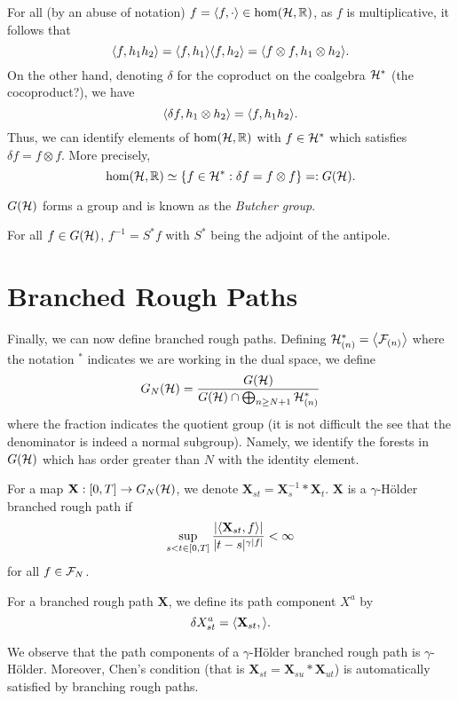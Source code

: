 \documentclass[a4paper, 10pt]{style/preprint}
\begin{document}
For all (by an abuse of notation) \(f = \< f, \cdot \> \in \hom(\CH, \mathbb{R})\), 
as \(f\) is multiplicative, it follows that 
\[\< f, h_1 h_2\> = \< f, h_1\> \< f, h_2\> = 
  \< f \otimes f, h_1 \otimes h_2\>.\]
On the other hand, denoting \(\delta\) for the coproduct on the coalgebra \({\mathcal H}^*\) (the cocoproduct?), we have 
\[\< \delta f, h_1 \otimes h_2\> = \< f, h_1 h_2\>.\] 
Thus, we can identify elements of \(\hom({\mathcal H}, \mathbb{R})\) with \(f \in {\mathcal H}^*\) which satisfies 
\(\delta f = f \otimes f\). More precisely, 
\[\hom({\mathcal H}, \mathbb{R}) \simeq \{f \in {\mathcal H}^* : \delta f = f \otimes f\} =: G({\mathcal H}).\]

\begin{definition}
  \(G({\mathcal H})\) forms a group and is known as the \textit{Butcher group}.
\end{definition}

\begin{proposition}
  For all \(f \in G({\mathcal H})\), \(f^{-1} = S^* f\) with \(S^*\) being the adjoint of the antipole.
\end{proposition}

\section{Branched Rough Paths}

Finally, we can now define branched rough paths. Defining \(\CH^*_{(n)} = \< \CF_{(n)}\>\) 
where the notation \(^*\) indicates we are working in the dual space, we define 
\[G_N({\mathcal H}) = \frac{G({\mathcal H})}{G({\mathcal H}) \cap \bigoplus_{n \ge N + 1} {\mathcal H}^*_{(n)}}\]
where the fraction indicates the quotient group (it is not difficult the see that the denominator 
is indeed a normal subgroup). Namely, we identify the forests in \(G({\mathcal H})\) which has order greater 
than \(N\) with the identity element.

\begin{definition}
  For a map \(\mathbf{X} : [0, T] \to G_N({\mathcal H})\), we denote \(\mathbf{X}_{st} = \mathbf{X}^{-1}_s * \mathbf{X}_t\).
  \(\mathbf{X}\) is a \(\gamma\)-H\"older branched rough path if 
  \[\sup_{s < t \in [0, T]} \frac{|\< \mathbf{X}_{st}, f\>|} {|t - s|^{\gamma|f|}} < \infty\]
  for all \(f \in {\mathcal F}_N\).

  For a branched rough path \(\mathbf{X}\), we define its path component \(X^a\) by 
  \[\delta X^a_{st} = \< \mathbf{X}_{st}, \tree<X>\>.\]
\end{definition}

We observe that the path components of a \(\gamma\)-H\"older branched rough path is \(\gamma\)-H\"older. 
Moreover, Chen's condition (that is \(\mathbf{X}_{st} = \mathbf{X}_{su} * \mathbf{X}_{ut}\)) is automatically 
satisfied by branching rough paths. 
\end{document}
